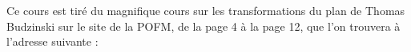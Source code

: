 Ce cours est tiré du magnifique cours sur les transformations du plan de Thomas Budzinski sur le site de la POFM, de la page 4 à la page 12, que l'on trouvera à l'adresse suivante :
